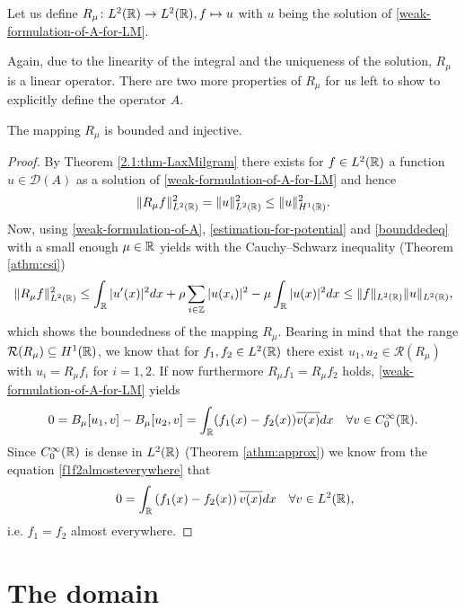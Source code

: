 \begin{definition}
	Let us define $R_{\mu} \colon L^{2}(\mathbb{R}) \rightarrow L^{2}(\mathbb{R}), f \mapsto u$ with $u$ being the solution of \eqref{weak-formulation-of-A-for-LM}.
\end{definition}
Again, due to the linearity of the integral and the uniqueness of the solution, $R_{\mu}$ is a linear operator. There are two more properties of $R_{\mu}$ for us left to show to explicitly define the operator $A$. 
\begin{theorem} \label{rmuinj}
	The mapping $R_{\mu}$ is bounded and injective.
	
	\begin{proof}
		By Theorem \ref{2.1:thm-LaxMilgram} there exists for $f \in L^{2}(\mathbb{R})$ a function $u \in \mathcal{D}(A)$ as a solution of \eqref{weak-formulation-of-A-for-LM} and hence
		\begin{equation}
			\| R_{\mu} f \|_{L^{2}(\mathbb{R})}^{2} = \| u \|_{L^{2}(\mathbb{R})}^{2} \leq \| u \|_{H^{1}(\mathbb{R})}^{2}. \label{bounddedeq}
		\end{equation}  
		Now, using \eqref{weak-formulation-of-A}, \eqref{estimation-for-potential} and \eqref{bounddedeq} with a small enough $\mu \in \mathbb{R}$ yields with the Cauchy–Schwarz inequality (Theorem \ref{athm:csi})
		\[ \| R_{\mu} f \|_{L^{2}(\mathbb{R})}^{2} \leq \int_{\mathbb{R}} |u'(x)|^{2} dx + \rho \sum_{i \in \mathbb{Z}} |u(x_{i})|^{2} - \mu \int_{\mathbb{R}} |u(x)|^{2} dx \leq \| f \|_{L^{2}(\mathbb{R})} \| u \|_{L^{2}(\mathbb{R})}, \]
		which shows the boundedness of the mapping $R_{\mu}$. Bearing in mind that the range $\mathcal{R}(R_{\mu}) \subseteq H^{1}(\mathbb{R})$, we know that for $f_{1}, f_{2} \in L^{2}(\mathbb{R})$ there exist  $u_{1}, u_{2} \in \mathcal{R}(R_{\mu})$ with $u_{i} = R_{\mu} f_{i}$ for $i = 1, 2$. If now furthermore $R_{\mu} f_{1} = R_{\mu} f_{2}$ holds, \eqref{weak-formulation-of-A-for-LM} yields
		\begin{equation}
			0 = B_{\mu}[u_{1}, v] - B_{\mu}[u_{2}, v] = \int_{\mathbb{R}} (f_{1}(x) - f_{2}(x)) \overline{v(x)} dx \quad \forall v \in C_{0}^{\infty}(\mathbb{R}). \label{f1f2almosteverywhere}
		\end{equation} 
		Since $C_{0}^{\infty}(\mathbb{R})$ is dense in $L^{2}(\mathbb{R})$ (Theorem \ref{athm:approx}) we know from the equation \eqref{f1f2almosteverywhere} that
		\[ 0 = \int_{\R} \left(f_{1}(x) - f_{2}(x)\right) \overline{v(x)} dx \quad \forall v \in L^{2}(\R), \]
		i.e. $f_{1} = f_{2}$ almost everywhere.
	\end{proof}
\end{theorem}

\section{The domain} \label{sec:3.2}

